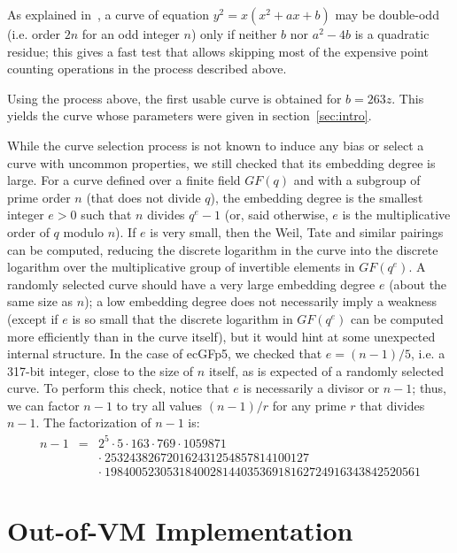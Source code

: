\documentclass{llncs}
\newcommand{\GF}{GF}
\begin{document}
As explained in~\cite{Por2020-4}, a curve of equation
$y^2 = x(x^2 + ax + b)$ may be double-odd (i.e. order $2n$ for an odd
integer $n$) only if neither $b$ nor $a^2 - 4b$ is a quadratic residue;
this gives a fast test that allows skipping most of the expensive
point counting operations in the process described above.

Using the process above, the first usable curve is obtained for
$b = 263z$. This yields the curve whose parameters were given
in section~\ref{sec:intro}.

While the curve selection process is not known to induce any bias or
select a curve with uncommon properties, we still checked that its
embedding degree is large. For a curve defined over a finite field
$\GF(q)$ and with a subgroup of prime order $n$ (that does not divide
$q$), the embedding degree is the smallest integer $e > 0$ such that $n$
divides $q^e - 1$ (or, said otherwise, $e$ is the multiplicative order
of $q$ modulo $n$). If $e$ is very small, then the Weil, Tate and
similar pairings can be computed, reducing the discrete logarithm in the
curve into the discrete logarithm over the multiplicative group of
invertible elements in $\GF(q^e)$. A randomly selected curve should have
a very large embedding degree $e$ (about the same size as $n$); a low
embedding degree does not necessarily imply a weakness (except if $e$ is
so small that the discrete logarithm in $\GF(q^e)$ can be computed more
efficiently than in the curve itself), but it would hint at some
unexpected internal structure. In the case of ecGFp5, we checked that
$e = (n - 1)/5$, i.e. a 317-bit integer, close to the size of $n$ itself,
as is expected of a randomly selected curve. To perform this check, notice
that $e$ is necessarily a divisor or $n - 1$; thus, we can factor $n - 1$
to try all values $(n-1)/r$ for any prime $r$ that divides $n - 1$. The
factorization of $n - 1$ is:
\begin{eqnarray*}
    n - 1 &=& 2^5 \cdot 5 \cdot 163 \cdot 769 \cdot 1059871 \\
          & & \cdot\ 253243826720162431254857814100127 \\
          & & \cdot\ 198400523053184002814403536918162724916343842520561
\end{eqnarray*}

\section{Out-of-VM Implementation}
\end{document}
